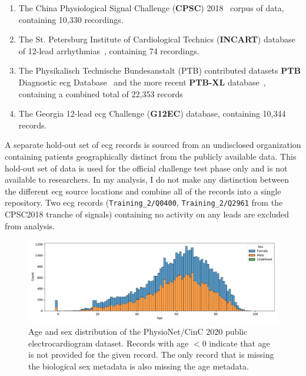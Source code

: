 \documentclass[\main/thesis.tex]{subfiles}
\begin{document}
\begin{enumerate}
    \item The China Physiological Signal Challenge (\textbf{CPSC}) 2018~\cite{liu_open_2018} corpus of data, containing 10,330 recordings.
    \item The St. Petersburg Institute of Cardiological Technics (\textbf{INCART}) database of 12-lead arrhythmias~\cite{tihonenko2008st}, containing 74 recordings.
    \item The Physikalisch Technische Bundesanstalt (PTB) contributed datasets \textbf{PTB} Diagnostic \gls{ecg} Database~\cite{NutzungderEKGSignaldatenbankCARDIODATderPTBberdasInternet} and the more recent \textbf{PTB-XL} database~\cite{wagner_ptb-xl_2020}, containing a combined total of 22,353 records
    \item The Georgia 12-lead \gls{ecg} Challenge (\textbf{G12EC}) database, containing 10,344 records.
\end{enumerate}

A separate hold-out set of \gls{ecg} records is sourced from an undisclosed organization containing patients geographically distinct from the publicly available data.
This hold-out set of data is used for the official challenge test phase only and is not available to researchers.
In my analysis, I do not make any distinction between the different \gls{ecg} source locations and combine all of the records into a single repository.
Two \gls{ecg} records (\texttt{Training\_2/Q0400}, \texttt{Training\_2/Q2961} from the CPSC2018 tranche of signals) containing no activity on any leads are excluded from analysis.

\begin{figure}[ht]
    \centering
    \includegraphics[width=14cm]{figure/age_sex_hist.pdf}
    \caption[Age and sex distribution of the PhysioNet/CinC 2020 public electrocardiogram dataset.]{Age and sex distribution of the PhysioNet/CinC 2020 public electrocardiogram dataset.
    Records with age $<0$ indicate that age is not provided for the given record. The only record that is missing the biological sex metadata is also missing the age metadata.}
    \label{fig:age_sex_hist}
\end{figure}
\end{document}
